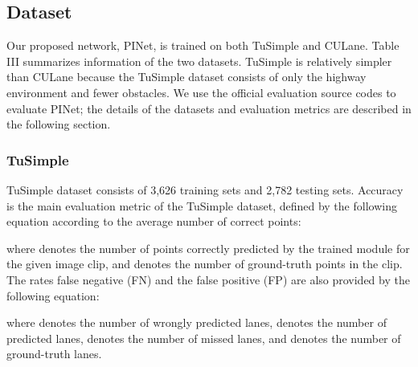 \documentclass[journal]{IEEEtran}
\begin{document}
\subsection{Dataset}
Our proposed network, PINet, is trained on both TuSimple and CULane. Table III summarizes information of the two datasets. TuSimple is relatively simpler than CULane because the TuSimple dataset consists of only the highway environment and fewer obstacles. We use the official evaluation source codes to evaluate PINet; the details of the datasets and evaluation metrics are described in the following section.


\subsubsection{TuSimple}
TuSimple dataset consists of 3,626 training sets and 2,782 testing sets. Accuracy is the main evaluation metric of the TuSimple dataset, defined by the following equation according to the average number of correct points:

where  denotes the number of points correctly predicted by the trained module for the given image clip, and  denotes the number of ground-truth points in the clip. The rates false negative (FN) and the false positive (FP) are also provided by the following equation:


where  denotes the number of wrongly predicted lanes,  denotes the number of predicted lanes,  denotes the number of missed lanes, and  denotes the number of ground-truth lanes.
\end{document}
